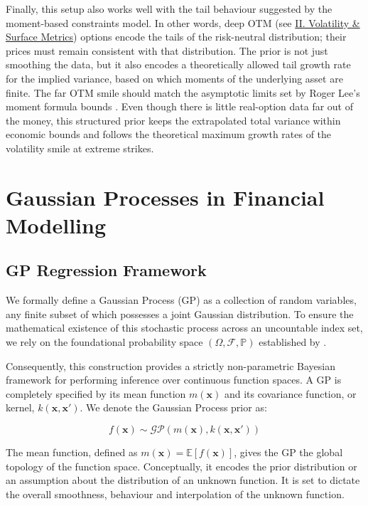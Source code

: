 \documentclass[12pt,oneside]{report}
\theoremstyle{definition}
\theoremstyle{remark}
\begin{document}
Finally, this setup also works well with the tail behaviour suggested by the moment-based constraints model. In other words, deep OTM (see \hyperref[sec:glossary_volatility_surface_metrics]{II. Volatility \& Surface Metrics}) options encode the tails of the risk-neutral distribution; their prices must remain consistent with that distribution. The prior is not just smoothing the data, but it also encodes a theoretically allowed tail growth rate for the implied variance, based on which moments of the underlying asset are finite. The far OTM smile should match the asymptotic limits set by Roger Lee’s moment formula bounds \cite{lee2004moment}. Even though there is little real-option data far out of the money, this structured prior keeps the extrapolated total variance within economic bounds and follows the theoretical maximum growth rates of the volatility smile at extreme strikes.

\chapter{Gaussian Processes in Financial Modelling}
\label{sec:chapter_3}
\section{GP Regression Framework}
We formally define a Gaussian Process (GP) as a collection of random variables, any finite subset of which possesses a joint Gaussian distribution. To ensure the mathematical existence of this stochastic process across an uncountable index set, we rely on the foundational probability space $(\Omega, \mathcal{F}, \mathbb{P})$ established by \citet{kolmogorov1933foundations}.

Consequently, this construction provides a strictly non-parametric Bayesian framework for performing inference over continuous function spaces. A GP is completely specified by its mean function $m(\mathbf{x})$ and its covariance function, or kernel, $k(\mathbf{x}, \mathbf{x}')$. We denote the Gaussian Process prior as:

\begin{equation}
f(\mathbf{x}) \sim \mathcal{GP}(m(\mathbf{x}), k(\mathbf{x}, \mathbf{x}'))
\end{equation}

The mean function, defined as $m(\mathbf{x}) = \mathbb{E}[f(\mathbf{x})]$, gives the GP the global topology of the function space. Conceptually, it encodes the prior distribution or an assumption about the distribution of an unknown function. It is set to dictate the overall smoothness, behaviour and interpolation of the unknown function. 
\end{document}
